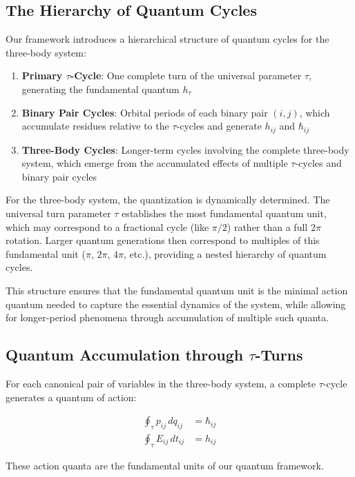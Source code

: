 \documentclass{article}
\begin{document}
\subsection{The Hierarchy of Quantum Cycles}

Our framework introduces a hierarchical structure of quantum cycles for the three-body system:

\begin{enumerate}
\item \textbf{Primary $\tau$-Cycle}: One complete turn of the universal parameter $\tau$, generating the fundamental quantum $h_\tau$
\item \textbf{Binary Pair Cycles}: Orbital periods of each binary pair $(i,j)$, which accumulate residues relative to the $\tau$-cycles and generate $h_{ij}$ and $\hbar_{ij}$
\item \textbf{Three-Body Cycles}: Longer-term cycles involving the complete three-body system, which emerge from the accumulated effects of multiple $\tau$-cycles and binary pair cycles
\end{enumerate}

For the three-body system, the quantization is dynamically determined. The universal turn parameter $\tau$ establishes the most fundamental quantum unit, which may correspond to a fractional cycle (like $\pi/2$) rather than a full $2\pi$ rotation. Larger quantum generations then correspond to multiples of this fundamental unit ($\pi$, $2\pi$, $4\pi$, etc.), providing a nested hierarchy of quantum cycles.

This structure ensures that the fundamental quantum unit is the minimal action quantum needed to capture the essential dynamics of the system, while allowing for longer-period phenomena through accumulation of multiple such quanta.

\subsection{Quantum Accumulation through $\tau$-Turns}

For each canonical pair of variables in the three-body system, a complete $\tau$-cycle generates a quantum of action:

\begin{align}
\oint_\tau p_{ij} \, dq_{ij} &= \hbar_{ij} \\
\oint_\tau E_{ij} \, dt_{ij} &= h_{ij}
\end{align}

These action quanta are the fundamental units of our quantum framework.
\end{document}
